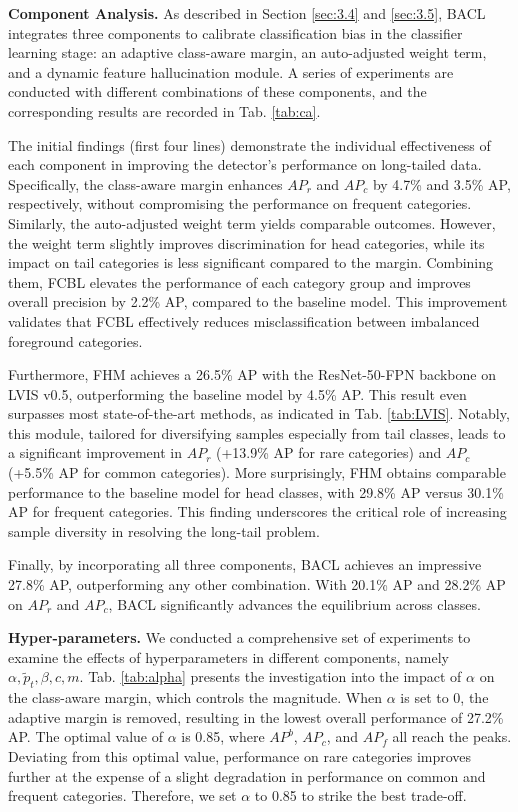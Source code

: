 \documentclass[lettersize,journal]{IEEEtran}
\begin{document}
\noindent\textbf{Component Analysis.}
As described in Section \ref{sec:3.4} and \ref{sec:3.5}, BACL integrates three components to calibrate classification bias in the classifier learning stage: an adaptive class-aware margin, an auto-adjusted weight term, and a dynamic feature hallucination module.
A series of experiments are conducted with different combinations of these components, and the corresponding results are recorded in Tab. \ref{tab:ca}.

The initial findings (first four lines) demonstrate the individual effectiveness of each component in improving the detector's performance on long-tailed data.
Specifically, the class-aware margin enhances $AP_r$ and $AP_c$ by 4.7\% and 3.5\% AP, respectively, without compromising the performance on frequent categories.
Similarly, the auto-adjusted weight term yields comparable outcomes.
However, the weight term slightly improves discrimination for head categories, while its impact on tail categories is less significant compared to the margin.
Combining them, FCBL elevates the performance of each category group and improves overall precision by 2.2\% AP, compared to the baseline model.
This improvement validates that FCBL effectively reduces misclassification between imbalanced foreground categories.

Furthermore, FHM achieves a 26.5\% AP with the ResNet-50-FPN backbone on LVIS v0.5, outperforming the baseline model by 4.5\% AP.
This result even surpasses most state-of-the-art methods, as indicated in Tab. \ref{tab:LVIS}.
Notably, this module, tailored for diversifying samples especially from tail classes, leads to a significant improvement in $AP_r$ (+13.9\% AP for rare categories) and $AP_c$ (+5.5\% AP for common categories).
More surprisingly, FHM obtains comparable performance to the baseline model for head classes, with 29.8\% AP versus 30.1\% AP for frequent categories.
This finding underscores the critical role of increasing sample diversity in resolving the long-tail problem.

Finally, by incorporating all three components, BACL achieves an impressive 27.8\% AP, outperforming any other combination.
With 20.1\% AP and 28.2\% AP on $AP_r$ and $AP_c$, BACL significantly advances the equilibrium across classes.


\noindent\textbf{Hyper-parameters.}
We conducted a comprehensive set of experiments to examine the effects of hyperparameters in different components, namely $\alpha,\tilde{p}_{t},\beta,c,m$.
Tab. \ref{tab:alpha} presents the investigation into the impact of $\alpha$ on the class-aware margin, which controls the magnitude.
When $\alpha$ is set to 0, the adaptive margin is removed, resulting in the lowest overall performance of 27.2\% AP.
The optimal value of $\alpha$ is 0.85, where $AP^b$, $AP_c$, and $AP_f$ all reach the peaks.
Deviating from this optimal value, performance on rare categories improves further at the expense of a slight degradation in performance on common and frequent categories.
Therefore, we set $\alpha$ to 0.85 to strike the best trade-off.
\end{document}
